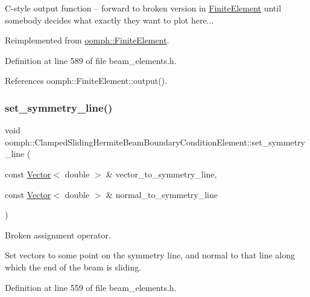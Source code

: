 C-\/style output function -- forward to broken version in \hyperlink{classoomph_1_1FiniteElement}{Finite\+Element} until somebody decides what exactly they want to plot here... 



Reimplemented from \hyperlink{classoomph_1_1FiniteElement_adfaee690bb0608f03320eeb9d110d48c}{oomph\+::\+Finite\+Element}.



Definition at line 589 of file beam\+\_\+elements.\+h.



References oomph\+::\+Finite\+Element\+::output().

\mbox{\label{classoomph_1_1ClampedSlidingHermiteBeamBoundaryConditionElement_a756e8213adbd4d04ebdaa72f50e87a1e}} 
\subsubsection{\texorpdfstring{set\+\_\+symmetry\+\_\+line()}{set\_symmetry\_line()}}
{\footnotesize\ttfamily void oomph\+::\+Clamped\+Sliding\+Hermite\+Beam\+Boundary\+Condition\+Element\+::set\+\_\+symmetry\+\_\+line (\begin{DoxyParamCaption}\item[{const \hyperlink{classoomph_1_1Vector}{Vector}$<$ double $>$ \&}]{vector\+\_\+to\+\_\+symmetry\+\_\+line,  }\item[{const \hyperlink{classoomph_1_1Vector}{Vector}$<$ double $>$ \&}]{normal\+\_\+to\+\_\+symmetry\+\_\+line }\end{DoxyParamCaption})\hspace{0.3cm}{\ttfamily [inline]}}



Broken assignment operator. 

Set vectors to some point on the symmetry line, and normal to that line along which the end of the beam is sliding. 

Definition at line 559 of file beam\+\_\+elements.\+h.



